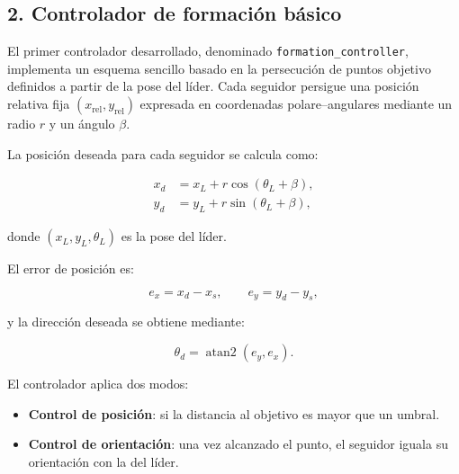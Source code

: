 
\subsection*{2. Controlador de formación básico}

El primer controlador desarrollado, denominado \texttt{formation\_controller},
implementa un esquema sencillo basado en la persecución de puntos objetivo
definidos a partir de la pose del líder. Cada seguidor persigue una posición
relativa fija \((x_{\text{rel}},y_{\text{rel}})\) expresada en coordenadas
polare–angulares mediante un radio \(r\) y un ángulo \(\beta\).

La posición deseada para cada seguidor se calcula como:

\begin{equation}
\begin{aligned}
x_d &= x_L + r\cos(\theta_L + \beta), \\
y_d &= y_L + r\sin(\theta_L + \beta),
\end{aligned}
\label{eq:t3_basic_target}
\end{equation}

donde \((x_L,y_L,\theta_L)\) es la pose del líder.

El error de posición es:



\[
e_x = x_d - x_s, \qquad e_y = y_d - y_s,
\]



y la dirección deseada se obtiene mediante:



\[
\theta_d = \operatorname{atan2}(e_y, e_x).
\]



El controlador aplica dos modos:

\begin{itemize}
    \item \textbf{Control de posición}: si la distancia al objetivo es mayor que un umbral.
    \item \textbf{Control de orientación}: una vez alcanzado el punto, el seguidor iguala su orientación con la del líder.
\end{itemize}

